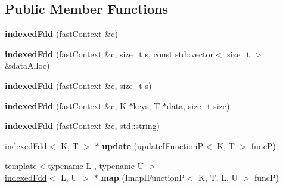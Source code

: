 \subsection*{Public Member Functions}
\begin{DoxyCompactItemize}
\item 
\hypertarget{classfaster_1_1indexedFdd_a00f525684f5c451a2824e3244b256604}{}\label{classfaster_1_1indexedFdd_a00f525684f5c451a2824e3244b256604} 
{\bfseries indexed\+Fdd} (\hyperlink{classfaster_1_1fastContext}{fast\+Context} \&c)
\item 
\hypertarget{classfaster_1_1indexedFdd_abe773f041ad055a201b986bf5ed2903e}{}\label{classfaster_1_1indexedFdd_abe773f041ad055a201b986bf5ed2903e} 
{\bfseries indexed\+Fdd} (\hyperlink{classfaster_1_1fastContext}{fast\+Context} \&c, size\+\_\+t s, const std\+::vector$<$ size\+\_\+t $>$ \&data\+Alloc)
\item 
\hypertarget{classfaster_1_1indexedFdd_a9f6dc447c25e6bf1143348cbc2fff92d}{}\label{classfaster_1_1indexedFdd_a9f6dc447c25e6bf1143348cbc2fff92d} 
{\bfseries indexed\+Fdd} (\hyperlink{classfaster_1_1fastContext}{fast\+Context} \&c, size\+\_\+t s)
\item 
\hypertarget{classfaster_1_1indexedFdd_a2dcdec6b27dadc929564ff3023eba569}{}\label{classfaster_1_1indexedFdd_a2dcdec6b27dadc929564ff3023eba569} 
{\bfseries indexed\+Fdd} (\hyperlink{classfaster_1_1fastContext}{fast\+Context} \&c, K $\ast$keys, T $\ast$data, size\+\_\+t size)
\item 
\hypertarget{classfaster_1_1indexedFdd_aab165b1eb0d4e7520187fdcca1505c37}{}\label{classfaster_1_1indexedFdd_aab165b1eb0d4e7520187fdcca1505c37} 
{\bfseries indexed\+Fdd} (\hyperlink{classfaster_1_1fastContext}{fast\+Context} \&c, std\+::string)
\item 
\hypertarget{classfaster_1_1indexedFdd_ac1c08f691a992e6fdf17597d675a6bab}{}\label{classfaster_1_1indexedFdd_ac1c08f691a992e6fdf17597d675a6bab} 
\hyperlink{classfaster_1_1indexedFdd}{indexed\+Fdd}$<$ K, T $>$ $\ast$ {\bfseries update} (update\+I\+FunctionP$<$ K, T $>$ funcP)
\item 
\hypertarget{classfaster_1_1indexedFdd_ae5d93ceaa1701aab3b3affc262ad3cc6}{}\label{classfaster_1_1indexedFdd_ae5d93ceaa1701aab3b3affc262ad3cc6} 
{\footnotesize template$<$typename L , typename U $>$ }\\\hyperlink{classfaster_1_1indexedFdd}{indexed\+Fdd}$<$ L, U $>$ $\ast$ {\bfseries map} (Imap\+I\+FunctionP$<$ K, T, L, U $>$ funcP)
\item 
\hypertarget{classfaster_1_1indexedFdd_a419f8dacfdbeb5f4d6d48e1c7a352fd8}{}\label{classfaster_1_1indexedFdd_a419f8dacfdbeb5f4d6d48e1c7a352fd8} 

\end{DoxyCompactItemize}

